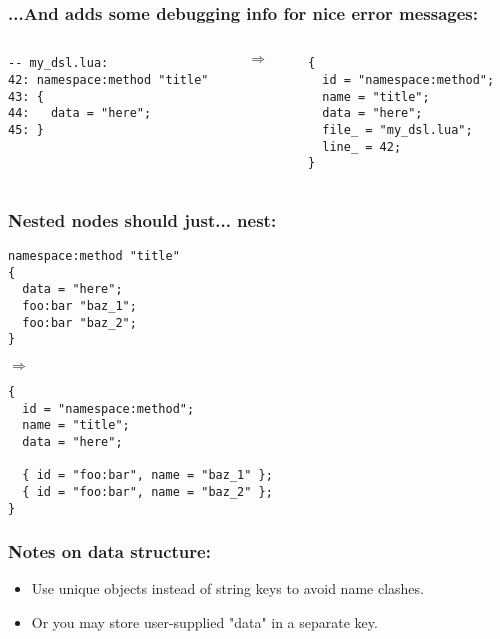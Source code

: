 \documentclass[handout]{beamer}
\begin{document}
\begin{frame}[fragile]

\frametitle{...And adds some debugging info for nice error messages:}

\begin{columns}

\begin{column}{0.5\textwidth}
\begin{verbatim}
-- my_dsl.lua:
42: namespace:method "title"
43: {
44:   data = "here";
45: }
\end{verbatim}
\end{column}

\begin{column}{0.05\textwidth}
$\Rightarrow$
\end{column}

\begin{column}{0.5\textwidth}
\begin{verbatim}
{
  id = "namespace:method";
  name = "title";
  data = "here";
  file_ = "my_dsl.lua";
  line_ = 42;
}
\end{verbatim}
\end{column}

\end{columns}

\end{frame}


\begin{frame}[fragile]

\frametitle{Nested nodes should just... nest:}

\begin{verbatim}
namespace:method "title"
{
  data = "here";
  foo:bar "baz_1";
  foo:bar "baz_2";
}
\end{verbatim}

$\Rightarrow$

\begin{verbatim}
{
  id = "namespace:method";
  name = "title";
  data = "here";

  { id = "foo:bar", name = "baz_1" };
  { id = "foo:bar", name = "baz_2" };
}
\end{verbatim}

\end{frame}


\begin{frame}[fragile]

\frametitle{Notes on data structure:}

\begin{itemize}
\item Use unique objects instead of string keys to avoid name clashes.
\item Or you may store user-supplied "data" in a separate key.
\end{itemize}

\end{frame}
\end{document}
